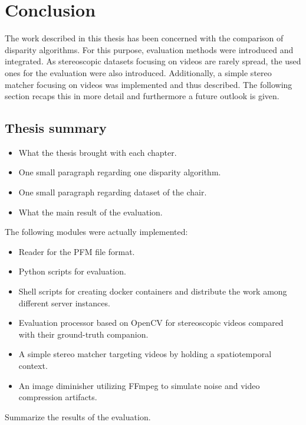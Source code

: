 \chapter{Conclusion}
\label{chap:conclusion}

The work described in this thesis has been concerned with the comparison of disparity algorithms.
For this purpose, evaluation methods were introduced and integrated.
As stereoscopic datasets focusing on videos are rarely spread, the used ones for the evaluation were also introduced.
Additionally, a simple stereo matcher focusing on videos was implemented and thus described.
The following section recaps this in more detail and furthermore a future outlook is given.

\section{Thesis summary}

\begin{itemize}
  \item What the thesis brought with each chapter.
  \item One small paragraph regarding one disparity algorithm.
  \item One small paragraph regarding dataset of the chair.
  \item What the main result of the evaluation.
\end{itemize}

\noindent The following modules were actually implemented:

\begin{itemize}
  \item Reader for the PFM file format.
  \item Python scripts for evaluation.
  \item Shell scripts for creating docker containers and distribute the work among different server instances.
  \item Evaluation processor based on OpenCV for stereoscopic videos compared with their ground-truth companion.
  \item A simple stereo matcher targeting videos by holding a spatiotemporal context.
  \item An image diminisher utilizing FFmpeg to simulate noise and video compression artifacts.
\end{itemize}

\noindent Summarize the results of the evaluation.


